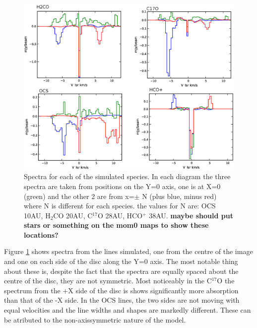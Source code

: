 \documentclass[useAMS,usenatbib]{mn2e}
\begin{document}
\begin{figure}
 \includegraphics[width=168mm]{Figures/sim/casa_all_spectra.eps}

 \caption{Spectra for each of the simulated species. In each diagram the three spectra are taken from positions on the Y=0 axis, one is at X=0 (green) and the other 2 are from x=$\pm$ N (plus blue, minus red) where N is different for each species. the values for N are: OCS 10AU, H$_2$CO 20AU, C$^{17}$O 28AU, HCO$^+$ 38AU. {\bf maybe should put stars or something on the mom0 maps to show these locations?}}
 \label{spectra}
\end{figure}

Figure \ref{spectra} shows spectra from the lines simulated, one from the centre of the image and one on each side of the disc along the Y=0 axis. The most notable thing about these is, despite the fact that the spectra are equally spaced about the centre of the disc, they are not symmetric. Most noticeably in the C$^{17}$O the spectrum from the +X side of the disc is shows significantly more absorption than that of the -X side. In the OCS lines, the two sides are not moving with equal velocities and the line widths and shapes are markedly different. These can be atributed to the non-axissymmetric nature of the model.

%
\end{document}
